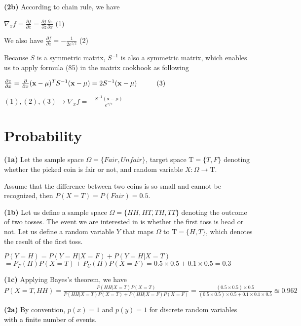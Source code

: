 \documentclass[12pt,article]{article}
\newcommand{\Tau}{\mathrm{T}}
\newcommand\tab[1][1cm]{\hspace*{#1}}
\begin{document}
\textbf{(2b)}
According to chain rule, we have 

$\nabla_xf = \frac{\partial f}{\partial x} = \frac{\partial f}{\partial z} 
\frac{\partial z}{\partial x}$ \tab[1cm] (1)

We also have 
$\frac{\partial f}{\partial z} = -\frac{1}{2e^{z/2}}$ \tab[1cm] (2)

Because $S$ is a symmetric matrix, $S^{-1}$ is also a symmetric matrix, which 
enables us to apply formula (85) in the matrix cookbook as following

$\frac{\partial z}{\partial x} 
= \frac{\partial }{\partial x}(\textbf{x} - \textbf{$\mu$})^TS^{-1}(\textbf{x} - \textbf{$\mu$})
= 2S^{-1}(\textbf{x} - \textbf{$\mu$}) \tab[1cm] (3)
$

$(1),(2),(3) \rightarrow \nabla_xf = -\frac{S^{-1}(\textbf{x} - \textbf{$\mu$})}{e^{z/2}}$

\newpage
\section*{Probability}
\textbf{(1a)} \newline
Let the sample space $\Omega = \{Fair,Unfair\}$, target space 
$\Tau = \{T,F\}$ denoting whether the picked coin is fair or not, and random 
variable $X : \Omega \rightarrow \Tau$.

Assume that the difference between two coins is so small and cannot be 
recognized, then $P(X = T) = P(Fair) = 0.5$.

\textbf{(1b)} \newline
Let us define a sample space $\Omega = \{HH,HT,TH,TT\}$ denoting the outcome of 
two tosses. 
The event we are interested in is whether the first toss is head or not. Let us 
define a random variable $Y$ that maps $\Omega$ to $\Tau = \{H,T\}$, which denotes 
the result of the first toss.

$P(Y = H) = P(Y = H | X = F) + P(Y = H | X = T)$ \newline
$= P_F(H)P(X = T) + P_U(H)P(X = F) = 0.5 \times 0.5 + 0.1 \times 0.5 = 0.3$

\textbf{(1c)} \newline
Applying Bayes's theorem, we have
$P(X = T, HH) = \frac{P(HH | X = T)P(X = T)}{P(HH | X = T)P(X = T) + P(HH | X = F)P(X = F)} 
= \frac{(0.5 \times 0.5) \times 0.5}{(0.5 \times 0.5) \times 0.5 + 0.1 \times 0.1 \times 0.5} \approxeq 0.962$

\textbf{(2a)} \newline
By convention, $p(x) = 1$ and $p(y) = 1$ for discrete random variables with a 
finite number of events.
\end{document}
